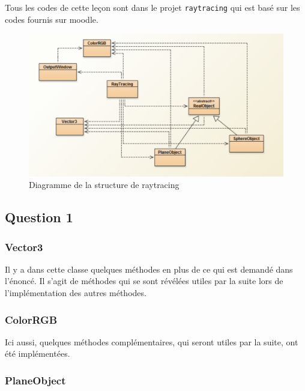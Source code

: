 Tous les codes de cette leçon sont dans le projet \texttt{raytracing} qui est basé sur les codes fournis sur moodle. 

\begin{figure}[H]
	\caption{\label{9_structure} Diagramme de la structure de raytracing}
	\centering
	\includegraphics[scale = 0.4]{9_structure.png}
\end{figure}

\subsection{Question 1}

\subsubsection{Vector3}

Il y a dans cette classe quelques méthodes en plus de ce qui est demandé dans l'énoncé. Il s'agit de méthodes qui se sont révélées utiles par la suite lors de l'implémentation des autres méthodes.


\subsubsection{ColorRGB}

Ici aussi, quelques méthodes complémentaires, qui seront utiles par la suite, ont été implémentées.


\subsubsection{PlaneObject}

